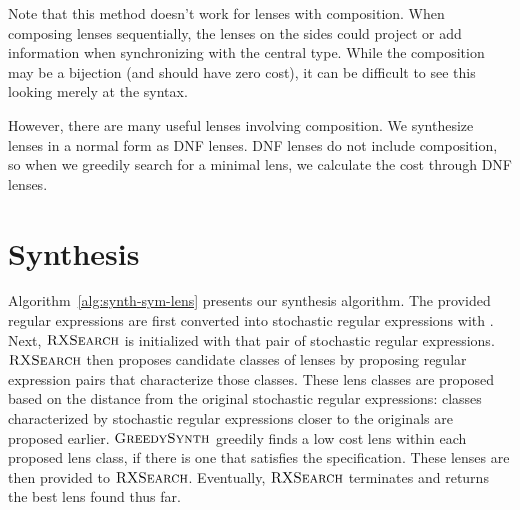 \documentclass[acmsmall,screen,anonymous]{acmart}
\begin{document}
Note that this method doesn't work for lenses with composition. When composing
lenses sequentially, the lenses on the sides could project or add information
when synchronizing with the central type. While the composition may be a
bijection (and should have zero cost), it can be difficult to see this looking
merely at the syntax.

However, there are many useful lenses involving composition. We synthesize
lenses in a normal form as DNF lenses. DNF lenses do not include composition, so
when we greedily search for a minimal lens, we calculate the cost through DNF
lenses.


\section{Synthesis}
\label{sec:synthesis}
Algorithm~\ref{alg:synth-sym-lens} presents our synthesis algorithm. The
provided regular expressions are first converted into stochastic regular
expressions with \ToStochastic. Next, $\RXSearch$ is initialized with that pair
of stochastic regular expressions. $\RXSearch$ then proposes candidate classes
of lenses by proposing regular expression pairs that characterize those classes.
These lens classes are proposed based on the distance from the original
stochastic regular expressions: classes characterized by stochastic regular
expressions closer to the originals are proposed earlier. $\GreedySynth$
greedily finds a low cost lens within each proposed lens class, if there is one
that satisfies the specification. These lenses are then provided to $\RXSearch$.
Eventually, $\RXSearch$ terminates and returns the best lens found thus far.
\end{document}
